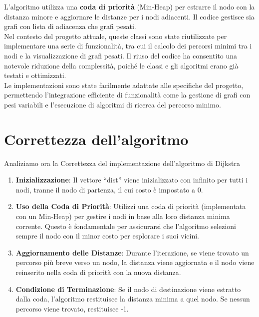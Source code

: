 \documentclass[a4paper,12pt]{article}
\begin{document}
\clearpage
L'algoritmo utilizza una \textbf{coda di priorità} (Min-Heap) per estrarre il nodo con 
la distanza minore e aggiornare le distanze per i nodi adiacenti. Il codice gestisce sia grafi 
con lista di adiacenza che grafi pesati.\\

Nel contesto del progetto attuale, queste classi sono state riutilizzate per 
implementare una serie di funzionalità, tra cui il calcolo dei percorsi minimi tra 
i nodi e la visualizzazione di grafi pesati. Il riuso del codice ha consentito una 
notevole riduzione della complessità, poiché le classi e gli algoritmi erano già 
testati e ottimizzati.\\

Le implementazioni sono state facilmente adattate alle specifiche del progetto, 
permettendo l'integrazione efficiente di funzionalità come la gestione di grafi con 
pesi variabili e l'esecuzione di algoritmi di ricerca del percorso minimo.


\section{Correttezza dell'algoritmo}

Analiziamo ora la Correttezza del implementazione dell'algoritmo di Dijkstra

\begin{enumerate}
    \item \textbf{Inizializzazione}: Il vettore ``dist'' viene inizializzato con infinito per 
    tutti i nodi, tranne il nodo di partenza, il cui costo è impostato a 0.

    \item \textbf{Uso della Coda di Priorità}: Utilizzi una coda di priorità 
    (implementata con un Min-Heap) per gestire i nodi in base alla loro distanza 
    minima corrente. 
    Questo è fondamentale per assicurarsi che l'algoritmo selezioni sempre il nodo 
    con il minor costo per esplorare i suoi vicini.

    \item \textbf{Aggiornamento delle Distanze}: Durante l'iterazione, se viene trovato un 
    percorso più breve verso un nodo, la distanza viene aggiornata e il nodo viene 
    reinserito nella coda di priorità con la nuova distanza.

    \item \textbf{Condizione di Terminazione}: Se il nodo di destinazione viene estratto dalla coda, 
    l'algoritmo restituisce la distanza minima a quel nodo. 
    Se nessun percorso viene trovato, restituisce -1.
\end{enumerate}
\end{document}
